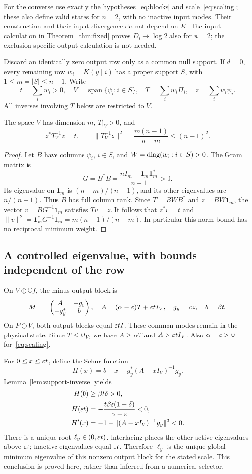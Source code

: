 For the converse use exactly the hypotheses~\eqref{eq:blocks} and scale~\eqref{eq:scaling}; these also define valid states for $n=2$, with no inactive input modes. Their construction and their input divergence do not depend on $K$. The input calculation in Theorem~\ref{thm:fixed} proves $D_i\to\log2$ also for $n=2$; the exclusion-specific output calculation is not needed.

Discard an identically zero output row only as a common null support. If $d=0$, every remaining row $w_i=K(y\mid i)$ has a proper support $S$, with $1\leq m=|S|\leq n-1$. Write
\[
 t=\sum_iw_i>0,\quad V=\operatorname{span}\{\psi_i:i\in S\},\quad
 T=\sum_iw_i\Pi_i,\quad z=\sum_iw_i\psi_i.
\]
All inverses involving $T$ below are restricted to $V$.
\begin{lemma}\label{lem:support-inverse}
The space $V$ has dimension $m$, $T|_V>0$, and
\[
 z^*T_V^{-1}z=t,\qquad
 \|T_V^{-1}z\|^2=\frac{m(n-1)}{n-m}\leq(n-1)^2.
\]
\end{lemma}
\begin{proof}
Let $B$ have columns $\psi_i$, $i\in S$, and $W=\operatorname{diag}(w_i:i\in S)>0$. The Gram matrix is
\[
 G=B^*B=\frac{nI_m-\mathbf1_m\mathbf1_m^*}{n-1}>0.
\]
Its eigenvalue on $\mathbf1_m$ is $(n-m)/(n-1)$, and its other eigenvalues are $n/(n-1)$. Thus $B$ has full column rank. Since $T=BWB^*$ and $z=BW\mathbf1_m$, the vector $v=BG^{-1}\mathbf1_m$ satisfies $Tv=z$. It follows that $z^*v=t$ and $\|v\|^2=\mathbf1_m^*G^{-1}\mathbf1_m=m(n-1)/(n-m)$. In particular this norm bound has no reciprocal minimum weight.
\end{proof}

\subsection{A controlled eigenvalue, with bounds independent of the row}
On $V\oplus\mathbb Cf$, the minus output block is
\[
 M_- = \begin{pmatrix}A&-g_y\\-g_y^*&b\end{pmatrix},\quad
 A=(\alpha-\varepsilon)T+\varepsilon t I_V,\quad g_y=cz,\quad b=\beta t.
\]
On $P\ominus V$, both output blocks equal $\varepsilon t I$. These common modes remain in the physical state. Since $T\leq tI_V$, we have $A\geq\alpha T$ and $A>\varepsilon t I_V$. Also $\alpha-\varepsilon>0$ for~\eqref{eq:scaling}.

For $0\leq x\leq\varepsilon t$, define the Schur function
\[
 H(x)=b-x-g_y^*(A-xI_V)^{-1}g_y.
\]
Lemma~\ref{lem:support-inverse} yields
\begin{align*}
 H(0)&\geq\beta t\delta>0,\\
 H(\varepsilon t)&=-\frac{t\beta\varepsilon(1-\delta)}{\alpha-\varepsilon}<0,\\
 H'(x)&=-1-\|(A-xI_V)^{-1}g_y\|^2<0.
\end{align*}
There is a unique root $\ell_y\in(0,\varepsilon t)$. Interlacing places the other active eigenvalues above $\varepsilon t$; inactive eigenvalues equal $\varepsilon t$. Therefore $\ell_y$ is the unique global minimum eigenvalue of this nonzero output block for the stated scale. This conclusion is proved here, rather than inferred from a numerical selector.

